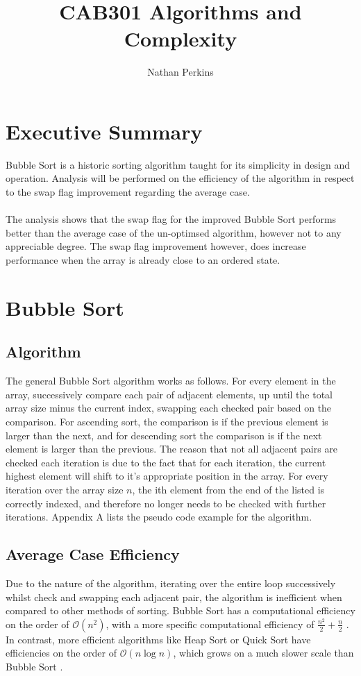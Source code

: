 \documentclass[]{article}
\title{CAB301 Algorithms and Complexity}
\author{Nathan Perkins}
\begin{document}
\maketitle
\newpage
\tableofcontents
\newpage
\section{Executive Summary}
Bubble Sort is a historic sorting algorithm taught for its simplicity in design and operation. Analysis will be performed on the efficiency of the algorithm in respect to the swap flag improvement regarding the average case. 
\\\\
The analysis shows that the swap flag for the improved Bubble Sort performs better than the average case of the un-optimsed algorithm, however not to any appreciable degree. The swap flag improvement however, does increase performance when the array is already close to an ordered state. 
\section{Bubble Sort}
\subsection{Algorithm}
The general Bubble Sort algorithm works as follows. For every element in the array, successively compare each pair of adjacent elements, up until the total array size minus the current index, swapping each checked pair based on the comparison. For ascending sort, the comparison is if the previous element is larger than the next, and for descending sort the comparison is if the next element is larger than the previous. The reason that not all adjacent pairs are checked each iteration is due to the fact that for each iteration, the current highest element will shift to it's appropriate position in the array. For every iteration over the array size $n$, the ith element from the end of the listed is correctly indexed, and therefore no longer needs to be checked with further iterations. Appendix A lists the pseudo code example for the algorithm.
\subsection{Average Case Efficiency}
Due to the nature of the algorithm, iterating over the entire loop successively whilst check and swapping each adjacent pair, the algorithm is inefficient when compared to other methods of sorting. Bubble Sort has a computational efficiency on the order of $\mathcal{O}(n^2)$, with a more specific computational efficiency of $\frac{n^2}{2} + \frac{n}{2}$
\cite{BubbleSort}.
In contrast, more efficient algorithms like Heap Sort or Quick Sort have efficiencies on the order of $\mathcal{O}(n\log{}n)$,
which grows on a much slower scale than Bubble Sort \cite{HeapSort}.
\end{document}
